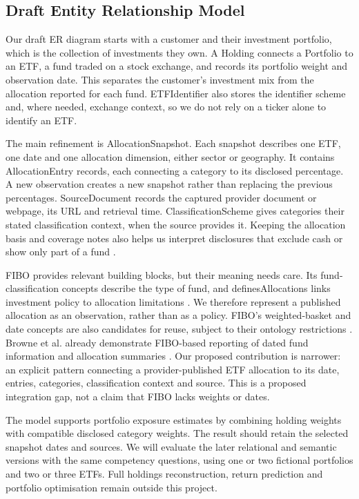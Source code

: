 \subsection{Draft Entity Relationship Model}
Our draft ER diagram starts with a customer and their investment portfolio, which is the collection of investments they own. A Holding connects a Portfolio to an ETF, a fund traded on a stock exchange, and records its portfolio weight and observation date. This separates the customer's investment mix from the allocation reported for each fund. ETFIdentifier also stores the identifier scheme and, where needed, exchange context, so we do not rely on a ticker alone to identify an ETF.

The main refinement is AllocationSnapshot. Each snapshot describes one ETF, one date and one allocation dimension, either sector or geography. It contains AllocationEntry records, each connecting a category to its disclosed percentage. A new observation creates a new snapshot rather than replacing the previous percentages. SourceDocument records the captured provider document or webpage, its URL and retrieval time. ClassificationScheme gives categories their stated classification context, when the source provides it. Keeping the allocation basis and coverage notes also helps us interpret disclosures that exclude cash or show only part of a fund \cite{vfv_disclosure,xic_disclosure}.

FIBO provides relevant building blocks, but their meaning needs care. Its fund-classification concepts describe the type of fund, and definesAllocations links investment policy to allocation limitations \cite{fibo_funds}. We therefore represent a published allocation as an observation, rather than as a policy. FIBO's weighted-basket and date concepts are also candidates for reuse, subject to their ontology restrictions \cite{fibo_baskets,fibo_dates}. Browne et al. already demonstrate FIBO-based reporting of dated fund information and allocation summaries \cite{browne2017}. Our proposed contribution is narrower: an explicit pattern connecting a provider-published ETF allocation to its date, entries, categories, classification context and source. This is a proposed integration gap, not a claim that FIBO lacks weights or dates.

The model supports portfolio exposure estimates by combining holding weights with compatible disclosed category weights. The result should retain the selected snapshot dates and sources. We will evaluate the later relational and semantic versions with the same competency questions, using one or two fictional portfolios and two or three ETFs. Full holdings reconstruction, return prediction and portfolio optimisation remain outside this project.

